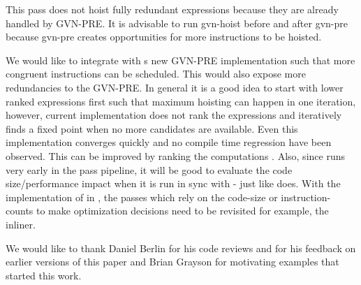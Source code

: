 \documentclass[sigplan,10pt,review,anonymous]{acmart}\settopmatter{printfolios=true,printccs=false,printacmref=false}
\begin{document}
This pass does not hoist fully redundant expressions because they are already
handled by GVN-PRE. It is advisable to run gvn-hoist before and after gvn-pre
because gvn-pre creates opportunities for more instructions to be hoisted.

We would like to integrate \GCM{} with s new GVN-PRE implementation such
that more congruent instructions can be scheduled. This would also expose more
redundancies to the GVN-PRE. In general it is a good idea to start with lower
ranked expressions first such that maximum hoisting can happen in one iteration,
however, current implementation does not rank the expressions and iteratively
finds a fixed point when no more candidates are available. Even this
implementation converges quickly and no compile time regression have been
observed. This can be improved by ranking the computations
\cite{rosen1988global}. Also, since \GCM{} runs very early in the pass pipeline,
it will be good to evaluate the code size/performance impact when it is run in
sync with \GVN{}-\PRE{} just like \GCC{} does. With the implementation of \GCM{}
in \LLVM{}, the passes which rely on the code-size or instruction-counts to make
optimization decisions need to be revisited for example, the inliner.


\begin{acks}                            %
We would like to thank Daniel Berlin for his code reviews and for his feedback
on earlier versions of this paper and Brian Grayson for motivating examples that
started this work.
\end{acks}


%


\end{document}
